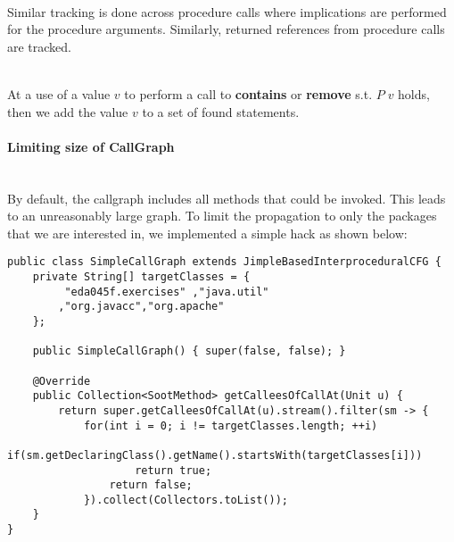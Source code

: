 \documentclass[a4paper]{article}
\newcommand{\NL}[0]{ \hfill\\\noindent }
\begin{document}
\NL
Similar tracking is done across procedure calls where implications are performed for the procedure arguments. Similarly, returned references from procedure calls are tracked.

\NL
At a use of a value $v$ to perform a call to \textbf{contains} or \textbf{remove} s.t. $P\;v$ holds, then we add the value $v$ to a set of found statements.

\paragraph{Limiting size of CallGraph}\NL
By default, the callgraph includes all methods that could be invoked. This leads to an unreasonably large graph. To limit the propagation to only the packages that we are interested in, we implemented a simple hack as shown below:
\begin{verbatim}
public class SimpleCallGraph extends JimpleBasedInterproceduralCFG {
	private String[] targetClasses = { 
	     "eda045f.exercises" ,"java.util"
		,"org.javacc","org.apache"
	};
	
	public SimpleCallGraph() { super(false, false); }
	
	@Override
	public Collection<SootMethod> getCalleesOfCallAt(Unit u) {
		return super.getCalleesOfCallAt(u).stream().filter(sm -> {
			for(int i = 0; i != targetClasses.length; ++i)
				if(sm.getDeclaringClass().getName().startsWith(targetClasses[i]))
					return true;
				return false;
			}).collect(Collectors.toList());
	}
}
\end{verbatim}
\end{document}
